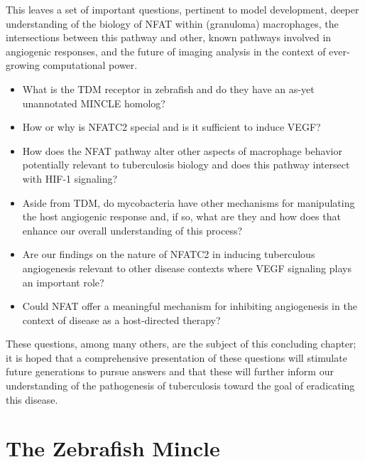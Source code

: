 This leaves a set of important questions, pertinent to model development, deeper understanding of the biology of NFAT within (granuloma) macrophages, the intersections between this pathway and other, known pathways involved in angiogenic responses, and the future of imaging analysis in the context of ever-growing computational power. 

\begin{itemize}
\item What is the TDM receptor in zebrafish and do they have an as-yet unannotated MINCLE homolog? 
\item How or why is NFATC2 special and is it sufficient to induce VEGF? 
\item How does the NFAT pathway alter other aspects of macrophage behavior potentially relevant to tuberculosis biology and does this pathway intersect with HIF-1\textalpha{} signaling? 
\item Aside from TDM, do mycobacteria have other mechanisms for manipulating the host angiogenic response and, if so, what are they and how does that enhance our overall understanding of this process? 
\item Are our findings on the nature of NFATC2 in inducing tuberculous angiogenesis relevant to other disease contexts where VEGF signaling plays an important role? 
\item Could NFAT offer a meaningful mechanism for inhibiting angiogenesis in the context of disease as a host-directed therapy?
\end{itemize}

These questions, among many others, are the subject of this concluding chapter; it is hoped that a comprehensive presentation of these questions will stimulate future generations to pursue answers and that these will further inform our understanding of the pathogenesis of tuberculosis toward the goal of eradicating this disease.

\section{The Zebrafish Mincle}

